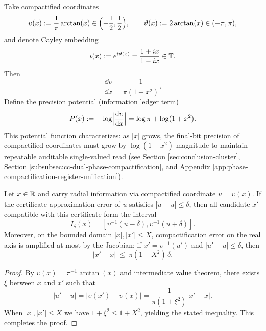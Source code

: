 \begin{definition}\label{def:radial-compactification-potential}
Take compactified coordinates
$$
\upsilon(x):=\frac{1}{\pi}\arctan(x)\in\Bigl(-\frac12,\frac12\Bigr),
\qquad
\vartheta(x):=2\arctan(x)\in(-\pi,\pi),
$$
and denote Cayley embedding
$$
\iota(x):=e^{i\vartheta(x)}=\frac{1+ix}{1-ix}\in\mathbb{T}.
$$
Then
$$
\frac{\dd\upsilon}{\dd x}=\frac{1}{\pi(1+x^2)}.
$$
Define the precision potential (information ledger term)
$$
P(x):=-\log\Bigl|\frac{\mathrm{d}\upsilon}{\mathrm{d} x}\Bigr|=\log\pi+\log(1+x^2).
$$
This potential function characterizes: as $|x|$ grows, the final-bit precision of compactified coordinates must grow by $\log(1+x^2)$ magnitude to maintain repeatable auditable single-valued read (see Section \ref{sec:conclusion-cluster}, Section \ref{subsubsec:cc-dual-phase-compactification}, and Appendix \ref{app:phase-compactification-register-unification}).\par
\end{definition}

\begin{proposition}\label{prop:radial-error-amplification}
Let $x\in\mathbb{R}$ and carry radial information via compactified coordinate $u=\upsilon(x)$. If the certificate approximation error of $u$ satisfies $|\tilde u-u|\le\delta$, then all candidate $x'$ compatible with this certificate form the interval
$$
I_\delta(x)=[\upsilon^{-1}(u-\delta),\upsilon^{-1}(u+\delta)].
$$
Moreover, on the bounded domain $|x|,|x'|\le X$, compactification error on the real axis is amplified at most by the Jacobian: if $x'=\upsilon^{-1}(u')$ and $|u'-u|\le\delta$, then
$$
|x'-x|\ \le\ \pi(1+X^2)\,\delta.
$$
\end{proposition}

\begin{proof}
By $\upsilon(x)=\pi^{-1}\arctan(x)$ and intermediate value theorem, there exists $\xi$ between $x$ and $x'$ such that
$$
|u'-u|=|\upsilon(x')-\upsilon(x)|=\frac{1}{\pi(1+\xi^2)}|x'-x|.
$$
When $|x|,|x'|\le X$ we have $1+\xi^2\le 1+X^2$, yielding the stated inequality. This completes the proof.\par
\end{proof}

